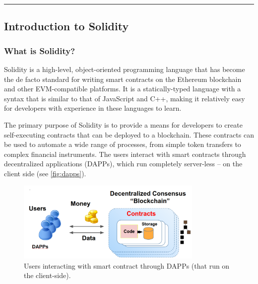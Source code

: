 \begin{center}\rule{0.5\linewidth}{0.5pt}\end{center}

\subsection{Introduction to
	Solidity}\label{section-1-introduction-to-solidity}

\subsubsection{What is Solidity?}\label{what-is-solidity}

Solidity is a high-level, object-oriented programming language that has
become the de facto standard for writing smart contracts on the Ethereum
blockchain and other EVM-compatible platforms. It is a statically-typed
language with a syntax that is similar to that of JavaScript and C++,
making it relatively easy for developers with experience in these
languages to learn.

The primary purpose of Solidity is to provide a means for developers to
create self-executing contracts that can be deployed to a blockchain.
These contracts can be used to automate a wide range of processes, from
simple token transfers to complex financial instruments.
The users interact with smart contracts through decentralized applications (DAPPs), which run completely server-less -- on the client side (see \autoref{fig:dapps}).


\begin{figure}[t]
	\begin{center}
		\includegraphics[width=0.8\textwidth]{./figs/smart-contracts-flow.png}
		\caption{Users interacting with smart contract through DAPPs (that run on the client-side).}		
		\label{fig:dapps}
	\end{center}	
\end{figure}
  

